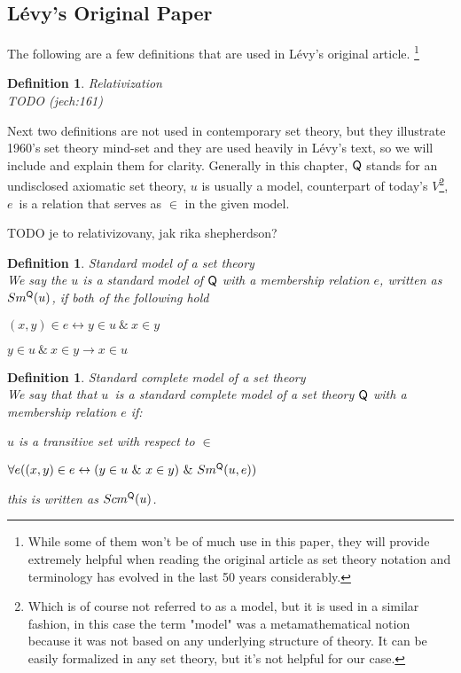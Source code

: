 \documentclass[12pt,a4paper]{article}
\newtheorem{definition}[theorem]{Definition}
\renewcommand{\iff}{\leftrightarrow}
\newcommand{\then}{\rightarrow}
\newcommand{\bce}{\begin{compactenum}}
\newcommand{\ece}{\end{compactenum}}
\begin{document}
\subsection{Lévy's Original Paper}\label{sec:Levy1960}

The following are a few definitions that are used in Lévy's original article. \footnote{While some of them won't be of much use in this paper, they will provide extremely helpful when reading the original article as set theory notation and terminology has evolved in the last 50 years considerably.}

\begin{definition}{Relativization}\label{def:relativization}\\
TODO (jech:161)
\end{definition}

Next two definitions are not used in contemporary set theory, but they illustrate 1960's set theory mind-set and they are used heavily in Lévy's text, so we will include and explain them for clarity. Generally in this chapter, $\sf{Q}$ stands for an undisclosed axiomatic set theory, $u$ is usually a model, counterpart of today's $V$\footnote{Which is of course not referred to as a model, but it is used in a similar fashion, in this case the term "model" was a metamathematical notion because it was not based on any underlying structure of theory. It can be easily formalized in any set theory, but it's not helpful for our case.}, $e$ is a relation that serves as $\in$ in the given model.

TODO je to relativizovany, jak rika shepherdson?
\begin{definition}{Standard model of a set theory}\\
We say the $u$ is a standard model of $\sf{Q}$ with a membership relation $e$, written as $Sm^{\sf{Q}}(u)$, if both of the following hold
\bce[(i)]
\item $(x, y) \in e \iff y \in u\ \&\ x \in y$
\item $y \in u\ \&\ x \in y \then x \in u$
\ece
\end{definition}
\begin{definition}{Standard complete model of a set theory}\\
We say that that $u$ is a standard complete model of a set theory $\sf{Q}$ with a membership relation $e$ if:
\bce[(i)]
\item $u$ is a transitive set with respect to $\in$
\item $\forall e ((x, y) \in e \iff (y \in u\ \&\ x \in y)\ \&\ Sm^{\sf{Q}}(u, e))$
\ece
this is written as $Scm^{\sf{Q}}(u)$.
\end{definition}
\end{document}

